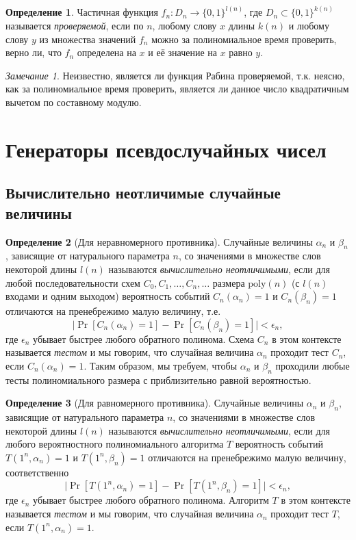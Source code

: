 \documentclass[12pt,a4paper]{article}
\newcommand{\bits}{\{0,1\}}
\newcommand{\poly}{\mathrm{poly}}
\theoremstyle{definition}
\newtheorem{definition}{Определение}[section]
\theoremstyle{plain}
\theoremstyle{remark}
\newtheorem{remark}{Замечание}[section]
\begin{document}
\begin{definition}
Частичная функция $f_n:D_n\to \bits^{l(n)}$, где $D_n\subset \bits^{k(n)}$ называется
\emph{проверяемой}, если по $n$, любому слову $x$ длины $k(n)$
и любому слову $y$ из множества значений $f_n$ можно 
за полиномиальное время проверить, верно ли, что $f_n$
определена на $x$ и её значение на $x$ равно $y$.
\end{definition}
\begin{remark}
Неизвестно, является ли функция Рабина проверяемой, т.к. неясно, как за полиномиальное время проверить, является
ли данное число квадратичным вычетом по составному модулю.
\end{remark}


\section{Генераторы псевдослучайных чисел}
\subsection{Вычислительно неотличимые случайные величины}
\begin{definition}[Для неравномерного противника]
Случайные величины $\alpha_n$ и $\beta_n$, зависящие
от натурального параметра $n$, со значениями в множестве
слов некоторой длины $l(n)$ называются \emph{вычислительно
неотличимыми}, если для любой последовательности схем
$C_0,C_1,\dotsc, C_n,\dotsc$ размера $\poly(n)$
(с $l(n)$ входами и одним выходом) вероятность событий
$C_n(\alpha_n) = 1$ и $C_n(\beta_n) = 1$ отличаются на 
пренебрежимо малую величину, т.е. 
$$\bigl|\Pr[C_n(\alpha_n) = 1] - \Pr[C_n(\beta_n) = 1]\bigr|<\epsilon_n,$$
где $\epsilon_n$ убывает быстрее любого обратного полинома.
Схема $C_n$ в этом контексте
называется \emph{тестом} и мы говорим, что случайная величина
$\alpha_n$ проходит тест $C_n$, если $C_n(\alpha_n)= 1$.
Таким образом, мы требуем, чтобы $\alpha_n$ и $\beta_n$
проходили любые тесты полиномиального размера с приблизительно
равной вероятностью.
\end{definition}

\begin{definition}[Для равномерного противника]
Случайные величины $\alpha_n$ и $\beta_n$, зависящие
от натурального параметра $n$, со значениями в множестве
слов некоторой длины $l(n)$ называются \emph{вычислительно
неотличимыми}, если для любого вероятностного 
полиномиального алгоритма $T$ вероятность событий
$T(1^n, \alpha_n) = 1$ и $T(1^n, \beta_n) = 1$ отличаются на 
пренебрежимо малую величину, соответственно
$$\bigl|\Pr[T(1^n, \alpha_n) = 1] - \Pr[T(1^n, \beta_n) = 1]\bigr|<\epsilon_n,$$
где $\epsilon_n$ убывает быстрее любого обратного полинома.
Алгоритм $T$ в этом контексте
называется \emph{тестом} и мы говорим, что случайная величина
$\alpha_n$ проходит тест $T$, если $T(1^n, \alpha_n)= 1$.
\end{definition}
\end{document}
